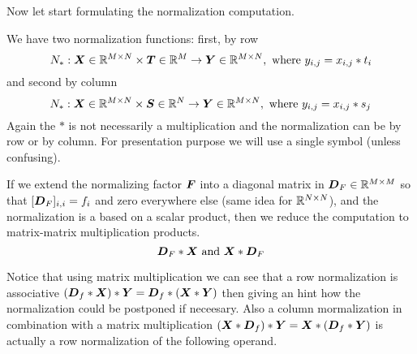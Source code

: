 \documentclass[acmsmall]{acmart}
\begin{document}
Now let start formulating the normalization computation.

\begin{definition}
  We have two normalization functions: first, by row
  \begin{equation}
    N_*: {\boldsymbol X}\in\mathbb{R}^{M\times N} \times {\boldsymbol T}\in \mathbb{R}^M \rightarrow {\boldsymbol Y}
    \in \mathbb{R}^{M\times N}, \text{ where } y_{i,j} = x_{i,j}*t_i
  \end{equation}
  and second by column
  \begin{equation}
    N_*: {\boldsymbol X}\in\mathbb{R}^{M\times N} \times  {\boldsymbol S}\in \mathbb{R}^N \rightarrow {\boldsymbol Y}
    \in \mathbb{R}^{M\times N}, \text{ where } y_{i,j} = x_{i,j}*s_j
  \end{equation}
  Again the $*$ is not necessarily a multiplication and the
  normalization can be by row or by column. For presentation purpose
  we will use a single symbol (unless confusing).
\end{definition}

If we extend the normalizing factor ${\boldsymbol F}$ into a diagonal matrix in
${\boldsymbol D}_F \in \mathbb{R}^{M\times M}$ so that $[{\boldsymbol D}_F]_{i,i} = f_i$ and
zero everywhere else (same idea for $\mathbb{R}^{N\times N}$), and the
normalization is a based on a scalar product, then we reduce the
computation to matrix-matrix multiplication products. 
\begin{equation}
  {\boldsymbol D}_F * {\boldsymbol X} \text{ and } {\boldsymbol X} * {\boldsymbol D}_F
\end{equation}

Notice that using matrix multiplication we can see that a row
normalization is associative $({\boldsymbol D}_f * {\boldsymbol X}) * {\boldsymbol Y} = {\boldsymbol D}_f
* ({\boldsymbol X} * {\boldsymbol Y})$ then giving an hint how the normalization could
be postponed if neceesary.  Also a column mormalization in combination
with a matrix multiplication $({\boldsymbol X}* {\boldsymbol D}_f) * {\boldsymbol Y} = {\boldsymbol X}*
({\boldsymbol D}_f * {\boldsymbol Y})$ is actually a row normalization of the following
operand.
\end{document}
